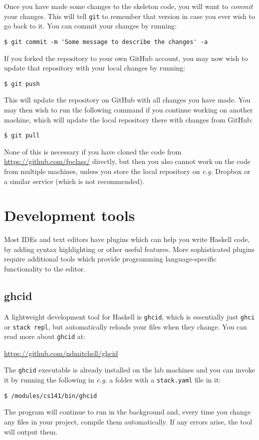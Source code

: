 Once you have made some changes to the skeleton code, you will want to \emph{commit} your changes. This will tell \texttt{\small git} to remember that version in case you ever wish to go back to it. You can commit your changes by running:
\begin{verbatim}
$ git commit -m 'Some message to describe the changes' -a
\end{verbatim}
If you forked the repository to your own GitHub account, you may now wish to update that repository with your local changes by running:
\begin{verbatim}
$ git push
\end{verbatim}
This will update the repository on GitHub with all changes you have made. You may then wish to run the following command if you continue working on another machine, which will update the local repository there with changes from GitHub:
\begin{verbatim}
$ git pull
\end{verbatim}
None of this is necessary if you have cloned the code from {\small \url{https://github.com/fpclass/}} directly, but then you also cannot work on the code from multiple machines, unless you store the local repository on \emph{e.g.} Dropbox or a similar service (which is not recommended). 

\section{Development tools}
\label{sec:dev-tools}

Most IDEs and text editors have plugins which can help you write Haskell code, by adding syntax highlighting or other useful features. More sophisticated plugins require additional tools which provide programming language-specific functionality to the editor. 

\subsection{ghcid}

A lightweight development tool for Haskell is \texttt{\small ghcid}, which is essentially just \texttt{\small ghci} or \texttt{\small stack repl}, but automatically reloads your files when they change. You can read more about \texttt{\small ghcid} at:
\begin{center} \small
	\url{https://github.com/ndmitchell/ghcid}
\end{center}
The \texttt{\small ghcid} executable is already installed on the lab machines and you can invoke it by running the following in \emph{e.g.} a folder with a \texttt{\small stack.yaml} file in it:
\begin{verbatim}
$ /modules/cs141/bin/ghcid
\end{verbatim}
The program will continue to run in the background and, every time you change any files in your project, compile them automatically. If any errors arise, the tool will output them.

